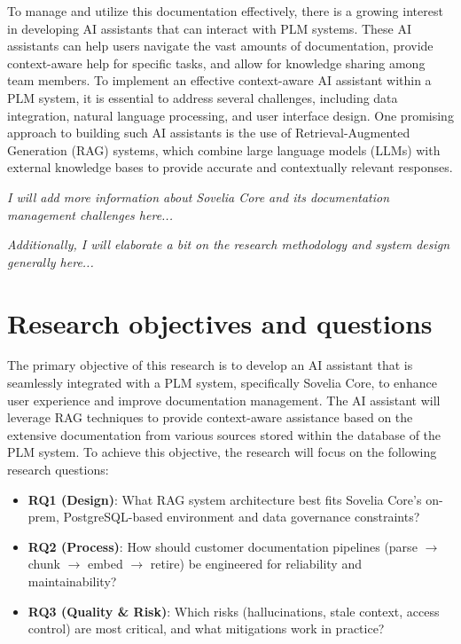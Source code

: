 To manage and utilize this documentation effectively, there is a growing interest in developing AI assistants that can interact with PLM systems. These AI assistants can help users navigate the vast amounts of documentation, provide context-aware help for specific tasks, and allow for knowledge sharing among team members. To implement an effective context-aware AI assistant within a PLM system, it is essential to address several challenges, including data integration, natural language processing, and user interface design. One promising approach to building such AI assistants is the use of Retrieval-Augmented Generation (RAG) systems, which combine large language models (LLMs) with external knowledge bases to provide accurate and contextually relevant responses\parencite{lewis_retrieval-augmented_2021}.


\textit{I will add more information about Sovelia Core and its documentation management challenges here...}

\textit{Additionally, I will elaborate a bit on the research methodology and system design generally here...}

\section{Research objectives and questions}
\label{sec:research-objectives-and-questions}

The primary objective of this research is to develop an AI assistant that is seamlessly integrated with a PLM system, specifically Sovelia Core, to enhance user experience and improve documentation management. The AI assistant will leverage RAG techniques to provide context-aware assistance based on the extensive documentation from various sources stored within the database of the PLM system. To achieve this objective, the research will focus on the following research questions:

\begin{itemize}
	\item \textbf{RQ1 (Design)}: What RAG system architecture best fits Sovelia Core's on-prem, PostgreSQL-based environment and data governance constraints?
	\item \textbf{RQ2 (Process)}: How should customer documentation pipelines (parse $ \rightarrow $ chunk $ \rightarrow $ embed $ \rightarrow $ retire) be engineered for reliability and maintainability?
	\item \textbf{RQ3 (Quality \& Risk)}: Which risks (hallucinations, stale context, access control) are most critical, and what mitigations work in practice?
\end{itemize}

